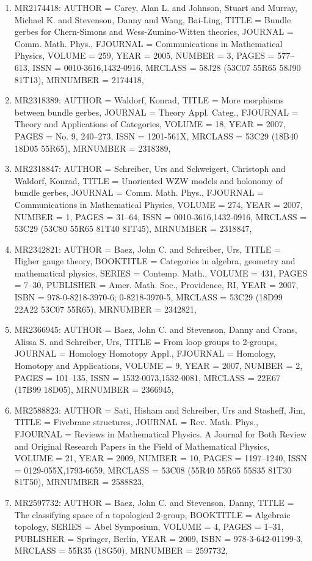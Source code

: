 \documentclass[11pt]{article}
\begin{document}
\begin{enumerate}[leftmargin=*]
  \item MR2174418: AUTHOR = Carey, Alan L. and Johnson, Stuart and Murray, Michael K. and Stevenson, Danny and Wang, Bai-Ling, TITLE = Bundle gerbes for Chern-Simons and Wess-Zumino-Witten theories, JOURNAL = Comm. Math. Phys., FJOURNAL = Communications in Mathematical Physics, VOLUME = 259, YEAR = 2005, NUMBER = 3, PAGES = 577--613, ISSN = 0010-3616,1432-0916, MRCLASS = 58J28 (53C07 55R65 58J90 81T13), MRNUMBER = 2174418,
  \item MR2318389: AUTHOR = Waldorf, Konrad, TITLE = More morphisms between bundle gerbes, JOURNAL = Theory Appl. Categ., FJOURNAL = Theory and Applications of Categories, VOLUME = 18, YEAR = 2007, PAGES = No. 9, 240--273, ISSN = 1201-561X, MRCLASS = 53C29 (18B40 18D05 55R65), MRNUMBER = 2318389,
  \item MR2318847: AUTHOR = Schreiber, Urs and Schweigert, Christoph and Waldorf, Konrad, TITLE = Unoriented WZW models and holonomy of bundle gerbes, JOURNAL = Comm. Math. Phys., FJOURNAL = Communications in Mathematical Physics, VOLUME = 274, YEAR = 2007, NUMBER = 1, PAGES = 31--64, ISSN = 0010-3616,1432-0916, MRCLASS = 53C29 (53C80 55R65 81T40 81T45), MRNUMBER = 2318847,
  \item MR2342821: AUTHOR = Baez, John C. and Schreiber, Urs, TITLE = Higher gauge theory, BOOKTITLE = Categories in algebra, geometry and mathematical physics, SERIES = Contemp. Math., VOLUME = 431, PAGES = 7--30, PUBLISHER = Amer. Math. Soc., Providence, RI, YEAR = 2007, ISBN = 978-0-8218-3970-6; 0-8218-3970-5, MRCLASS = 53C29 (18D99 22A22 53C07 55R65), MRNUMBER = 2342821,
  \item MR2366945: AUTHOR = Baez, John C. and Stevenson, Danny and Crans, Alissa S. and Schreiber, Urs, TITLE = From loop groups to 2-groups, JOURNAL = Homology Homotopy Appl., FJOURNAL = Homology, Homotopy and Applications, VOLUME = 9, YEAR = 2007, NUMBER = 2, PAGES = 101--135, ISSN = 1532-0073,1532-0081, MRCLASS = 22E67 (17B99 18D05), MRNUMBER = 2366945,
  \item MR2588823: AUTHOR = Sati, Hisham and Schreiber, Urs and Stasheff, Jim, TITLE = Fivebrane structures, JOURNAL = Rev. Math. Phys., FJOURNAL = Reviews in Mathematical Physics. A Journal for Both Review and Original Research Papers in the Field of Mathematical Physics, VOLUME = 21, YEAR = 2009, NUMBER = 10, PAGES = 1197--1240, ISSN = 0129-055X,1793-6659, MRCLASS = 53C08 (55R40 55R65 55S35 81T30 81T50), MRNUMBER = 2588823,
  \item MR2597732: AUTHOR = Baez, John C. and Stevenson, Danny, TITLE = The classifying space of a topological 2-group, BOOKTITLE = Algebraic topology, SERIES = Abel Symposium, VOLUME = 4, PAGES = 1--31, PUBLISHER = Springer, Berlin, YEAR = 2009, ISBN = 978-3-642-01199-3, MRCLASS = 55R35 (18G50), MRNUMBER = 2597732,

\end{enumerate}
\end{document}
